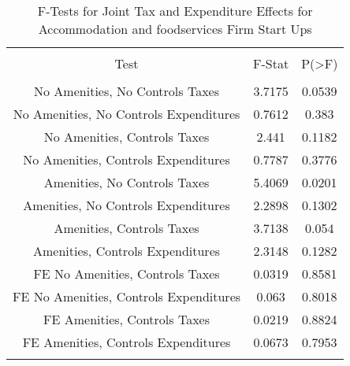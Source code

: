 
\begin{table}[!htbp] \centering 
  \caption{F-Tests for Joint Tax and Expenditure Effects for Accommodation and foodservices Firm Start Ups} 
  \label{72Ftests} 
\begin{tabular}{@{\extracolsep{5pt}} ccc} 
\\[-1.8ex]\hline 
\hline \\[-1.8ex] 
Test & F-Stat & P(\textgreater F) \\ 
\hline \\[-1.8ex] 
No Amenities, No Controls Taxes & 3.7175 & 0.0539 \\ 
No Amenities, No Controls Expenditures & 0.7612 & 0.383 \\ 
No Amenities, Controls Taxes & 2.441 & 0.1182 \\ 
No Amenities, Controls Expenditures & 0.7787 & 0.3776 \\ 
Amenities, No Controls Taxes & 5.4069 & 0.0201 \\ 
Amenities, No Controls Expenditures & 2.2898 & 0.1302 \\ 
Amenities, Controls Taxes & 3.7138 & 0.054 \\ 
Amenities, Controls Expenditures & 2.3148 & 0.1282 \\ 
FE No Amenities, Controls Taxes & 0.0319 & 0.8581 \\ 
FE No Amenities, Controls Expenditures & 0.063 & 0.8018 \\ 
FE Amenities, Controls Taxes & 0.0219 & 0.8824 \\ 
FE Amenities, Controls Expenditures & 0.0673 & 0.7953 \\ 
\hline \\[-1.8ex] 
\end{tabular} 
\end{table} 
